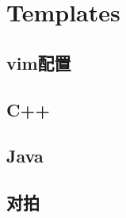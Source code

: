 \documentclass[landscape, twocolumn, 8pt, a4paper, twoside]{extarticle}
\begin{document}
\section{Templates}
  \subsection{vim配置}
    
  \subsection{C++}
    
  \subsection{Java}
    
  \subsection{对拍}
    
\end{document}
